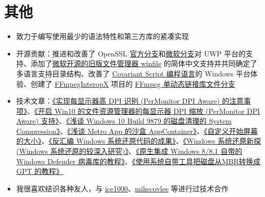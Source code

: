 \documentclass{resume}
\begin{document}
\section{其他}
\begin{itemize}

  \item 致力于编写使用最少的语法特性和第三方库的紧凑实现

  \item 开源贡献：推进和改善了 OpenSSL \href{https://github.com/openssl/openssl/pulls?q=is:pr+author:MouriNaruto+}{官方分支}和\href{https://github.com/microsoft/openssl/pulls?q=is:pr+author:MouriNaruto+}{微软分支}对 UWP 平台的支持、添加了\href{https://github.com/microsoft/winfile/pulls?q=is:pr+author:MouriNaruto+}{微软开源的旧版文件管理器 winfile} 的简体中文支持并共同确定了多语言支持目录结构、改善了 \href{https://github.com/covscript/covscript/pulls?q=is:pr+author:MouriNaruto+}{Covariant Script 编程语言}的 Windows 平台体验、创建了 \href{https://github.com/ffmpeginteropx/FFmpegInteropX/pulls?q=is:pr+author:MouriNaruto+}{FFmpegInteropX} 项目的 \href{https://github.com/ffmpeginteropx/FFmpegInteropX/tree/FFmpegUniversal}{FFmpeg 单动态链接库文件分支}
  
  \item 技术文章：\href{https://www.52pojie.cn/thread-512713-1-1.html}{《实现每显示器高 DPI 识别 (Per\-Monitor DPI Aware) 的注意事项》}、\href{https://www.52pojie.cn/thread-506556-1-1.html}{《开启 Win10 的文件资源管理器的每显示器 DPI 缩放 (Per\-Monitor DPI Aware) 支持》}、\href{http://bbs.pcbeta.com/viewthread-1567726-1-1.html}{《浅谈 Windows 10 Build 9879 的磁盘清理的 System Compression》}、\href{http://bbs.pcbeta.com/viewthread-1611980-1-1.html}{《浅谈 Metro App 的沙盒 AppContainer》}、\href{http://bbs.pcbeta.com/viewthread-1524688-1-1.html}{《自定义开始屏幕的大小》}、\href{http://bbs.pcbeta.com/viewthread-1535789-1-1.html}{《反汇编 Windows 系统还原代码的成果》}、\href{http://bbs.pcbeta.com/viewthread-1507617-1-1.html}{《Windows 系统还原新探 (Windows 系统还原的较深入研究)》}、\href{http://bbs.pcbeta.com/viewthread-1519551-1-1.html}{《原生集成 Windows 8/8.1 自带的 Windows Defender 病毒库的教程》}、\href{http://bbs.pcbeta.com/viewthread-1488892-1-1.html}{《使用系统自带工具把磁盘从MBR转换成 GPT 的教程》}
  
  \item 我很喜欢结识各种友人，与 \href{https://github.com/ice1000/}{ice1000}、\href{https://github.com/mikecovlee}{mikecovlee} 等进行过技术合作

\end{itemize}
\end{document}
